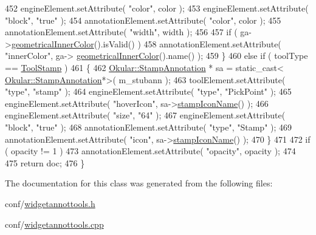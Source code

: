 \begin{DoxyCode}
452         engineElement.setAttribute( \textcolor{stringliteral}{"color"}, color );
453         engineElement.setAttribute( \textcolor{stringliteral}{"block"}, \textcolor{stringliteral}{"true"} );
454         annotationElement.setAttribute( \textcolor{stringliteral}{"color"}, color );
455         annotationElement.setAttribute( \textcolor{stringliteral}{"width"}, width );
456 
457         \textcolor{keywordflow}{if} ( ga->\hyperlink{classOkular_1_1GeomAnnotation_a5c84e1cbdf0d2bb6b75b6d6b049af63b}{geometricalInnerColor}().isValid() )
458             annotationElement.setAttribute( \textcolor{stringliteral}{"innerColor"}, ga->
      \hyperlink{classOkular_1_1GeomAnnotation_a5c84e1cbdf0d2bb6b75b6d6b049af63b}{geometricalInnerColor}().name() );
459     \}
460     \textcolor{keywordflow}{else} \textcolor{keywordflow}{if} ( toolType == \hyperlink{classEditAnnotToolDialog_ae4572c0cf4fc351cf03e4d86ef595a9ca7cc3433c386c961f1ba62c445958da3d}{ToolStamp} )
461     \{
462         \hyperlink{classOkular_1_1StampAnnotation}{Okular::StampAnnotation} * sa = \textcolor{keyword}{static\_cast<}
      \hyperlink{classOkular_1_1StampAnnotation}{Okular::StampAnnotation}*\textcolor{keyword}{>}( m\_stubann );
463         toolElement.setAttribute( \textcolor{stringliteral}{"type"}, \textcolor{stringliteral}{"stamp"} );
464         engineElement.setAttribute( \textcolor{stringliteral}{"type"}, \textcolor{stringliteral}{"PickPoint"} );
465         engineElement.setAttribute( \textcolor{stringliteral}{"hoverIcon"}, sa->\hyperlink{classOkular_1_1StampAnnotation_a444978f06c11e4f74fbf1653555b4170}{stampIconName}() );
466         engineElement.setAttribute( \textcolor{stringliteral}{"size"}, \textcolor{stringliteral}{"64"} );
467         engineElement.setAttribute( \textcolor{stringliteral}{"block"}, \textcolor{stringliteral}{"true"} );
468         annotationElement.setAttribute( \textcolor{stringliteral}{"type"}, \textcolor{stringliteral}{"Stamp"} );
469         annotationElement.setAttribute( \textcolor{stringliteral}{"icon"}, sa->\hyperlink{classOkular_1_1StampAnnotation_a444978f06c11e4f74fbf1653555b4170}{stampIconName}() );
470     \}
471 
472     \textcolor{keywordflow}{if} ( opacity != 1 )
473         annotationElement.setAttribute( \textcolor{stringliteral}{"opacity"}, opacity );
474 
475     \textcolor{keywordflow}{return} doc;
476 \}
\end{DoxyCode}


The documentation for this class was generated from the following files\+:\begin{DoxyCompactItemize}
\item 
conf/\hyperlink{widgetannottools_8h}{widgetannottools.\+h}\item 
conf/\hyperlink{widgetannottools_8cpp}{widgetannottools.\+cpp}\end{DoxyCompactItemize}
